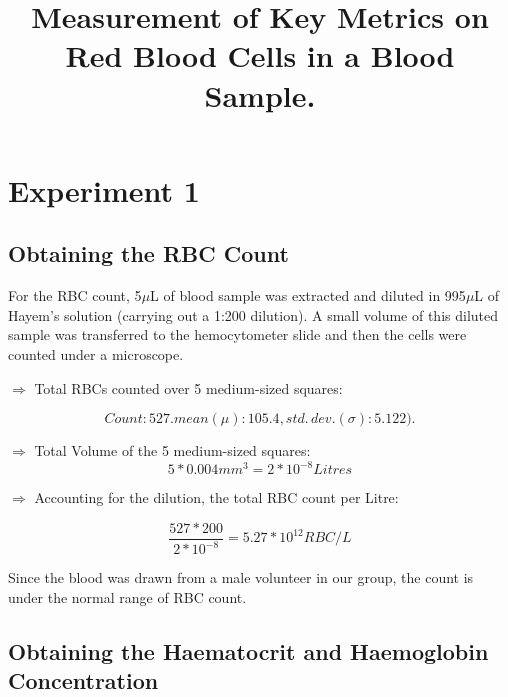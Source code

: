 \documentclass[pdflatex,sn-mathphys]{sn-jnl}%
\theoremstyle{thmstyleone}%
\theoremstyle{thmstyletwo}%
\theoremstyle{thmstylethree}%
\begin{document}
\title[Red Blood Cell Lab]{Measurement of Key Metrics on Red Blood Cells in a Blood Sample.}

\author*[1,2]{ }





\maketitle

\section{Experiment 1}\label{sec1}
\subsection{Obtaining the RBC Count}
For the RBC count, 5$\mu$L of blood sample was extracted and diluted in 995$\mu$L of Hayem's solution (carrying out a 1:200 dilution). A small volume of this diluted sample was transferred to the hemocytometer slide and then the cells were counted under a microscope.\vspace{2mm}

$\Rightarrow$ Total RBCs counted over 5 medium-sized squares: 

\[Count: 527. mean(\mu): 105.4, std. \, dev.(\sigma): 5.122). \]\vspace{0.3mm}

$\Rightarrow$ Total Volume of the 5 medium-sized squares: 
\[5 * 0.004mm^{3} = 2 * 10^{-8} Litres\]

$\Rightarrow$ Accounting for the dilution, the total RBC count per Litre:

\[\frac{527 * 200}{2 * 10^{-8}} = 5.27 * 10^{12} RBC/L\]\vspace{0.3mm}

Since the blood was drawn from a male volunteer in our group, the count is under the normal range of RBC count. 

\subsection{Obtaining the Haematocrit and Haemoglobin Concentration}
\end{document}
